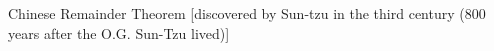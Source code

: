 Chinese Remainder Theorem [discovered by Sun-tzu in the third century (800 years after the O.G. Sun-Tzu lived)]
